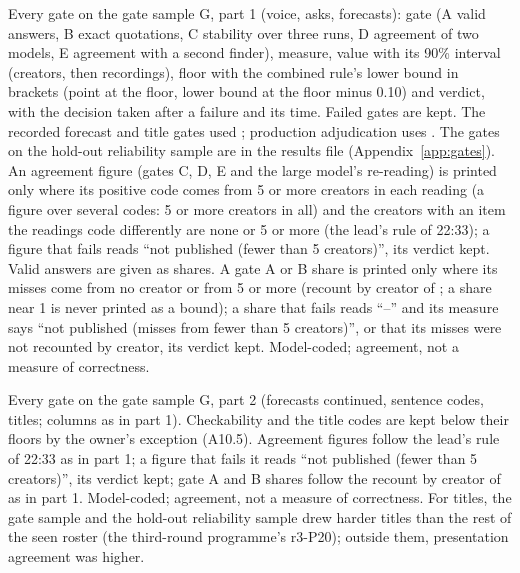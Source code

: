 \begin{table}[tp]
\centering
\small

\caption{Every gate on the gate sample G, part 1 (voice, asks, forecasts): gate (A valid answers, B exact quotations,
C stability over three runs, D agreement of two models, E agreement with a second finder), measure, value with its
90\% interval (creators, then recordings), floor with the combined rule's lower bound in brackets (point at the floor,
lower bound at the floor minus 0.10) and verdict, with the decision taken after a failure and its time. Failed gates
are kept. The recorded forecast and title gates used \ModelLargeGate; production adjudication uses \ModelLarge. The gates
on the hold-out reliability sample are in the results file (Appendix~\ref{app:gates}). An agreement figure (gates C, D,
E and the large model's re-reading) is printed only where its positive code comes from 5 or more creators in each
reading (a figure over several codes: 5 or more creators in all) and the creators with an item the readings code
differently are none or 5 or more (the lead's rule of 22:33); a figure that fails reads ``not published (fewer than 5
creators)'', its verdict kept. Valid answers are given as shares. A gate A or B share is printed only where its misses
come from no creator or from 5 or more (recount by creator of \RecountStamp; a share near 1 is never printed as a
bound); a share that fails reads ``--'' and its measure says ``not published (misses from fewer than 5 creators)'', or
that its misses were not recounted by creator, its verdict kept. Model-coded; agreement, not a measure of correctness. \LabelValidity}
\label{tab:gates}
\end{table}

\begin{table}[tp]
\centering
\small

\caption{Every gate on the gate sample G, part 2 (forecasts continued, sentence codes, titles; columns as in part 1).
Checkability and the title codes are kept below their floors by the owner's exception (A10.5). Agreement figures follow
the lead's rule of 22:33 as in part 1; a figure that fails it reads ``not published (fewer than 5 creators)'', its
verdict kept; gate A and B shares follow the recount by creator of \RecountStamp{} as in part 1. Model-coded; agreement,
not a measure of correctness. For titles, the gate sample and the hold-out reliability sample drew harder titles than the rest of the seen roster (the third-round programme's r3-P20); outside them, presentation agreement was higher. \LabelValidity}
\label{tab:gates-b}
\end{table}

